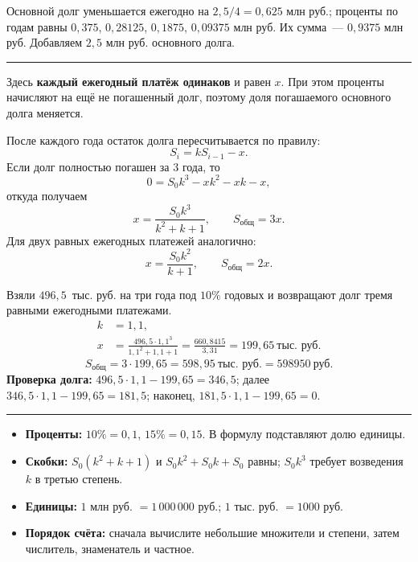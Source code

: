 \documentclass[a4paper,12pt]{article}
\newcommand{\key}[1]{\textcolor{darkaccent}{\textbf{#1}}}
\newcommand{\microhead}[1]{\vspace{2mm}{\large\textcolor{darkaccent}{\bfseries #1}}\par\vspace{1mm}}
\newcommand{\topic}[1]{\vspace{4mm}{\Large\textcolor{darkaccent}{\bfseries #1}}\par\vspace{1mm}\textcolor{rulegray}{\rule{\linewidth}{0.35pt}}\vspace{2mm}}
\begin{document}
\microhead{Проверка по годам}
Основной долг уменьшается ежегодно на $2{,}5/4=0{,}625$ млн руб.; проценты по годам равны $0{,}375$, $0{,}28125$, $0{,}1875$, $0{,}09375$ млн руб. Их сумма~--- $0{,}9375$ млн руб. Добавляем $2{,}5$ млн руб. основного долга.

\topic{5. Аннуитетный кредит}
Здесь \key{каждый ежегодный платёж одинаков} и равен $x$. При этом проценты начисляют на ещё не погашенный долг, поэтому доля погашаемого основного долга меняется.

После каждого года остаток долга пересчитывается по правилу:
\[
\boxed{S_{i}=kS_{i-1}-x.}
\]
Если долг полностью погашен за $3$ года, то
\[
0=S_0k^3-xk^2-xk-x,
\]
откуда получаем
\[
\boxed{x=\frac{S_0k^3}{k^2+k+1}},\qquad
\boxed{S_{\text{общ}}=3x}.
\]
Для двух равных ежегодных платежей аналогично:
\[
\boxed{x=\frac{S_0k^2}{k+1}},\qquad
\boxed{S_{\text{общ}}=2x}.
\]
\microhead{Пример. Три равных платежа}
Взяли $496{,}5$~тыс. руб. на три года под $10\%$ годовых и возвращают долг тремя равными ежегодными платежами.
\[
\begin{aligned}
k&=1{,}1,\\
x&=\frac{496{,}5\cdot1{,}1^3}{1{,}1^2+1{,}1+1}
=\frac{660{,}8415}{3{,}31}=199{,}65\ \text{тыс. руб.}
\end{aligned}
\]
\[
S_{\text{общ}}=3\cdot199{,}65=598{,}95\ \text{тыс. руб.}
=\boxed{598950\ \text{руб.}}
\]
\textbf{Проверка долга:} $496{,}5\cdot1{,}1-199{,}65=346{,}5$; далее $346{,}5\cdot1{,}1-199{,}65=181{,}5$; наконец, $181{,}5\cdot1{,}1-199{,}65=0$.

\topic{6. Вычисления и единицы измерения}
\begin{itemize}
\item \textbf{Проценты:} $10\%=0{,}1$, $15\%=0{,}15$. В формулу подставляют долю единицы.
\item \textbf{Скобки:} $S_0(k^2+k+1)$ и $S_0k^2+S_0k+S_0$ равны; $S_0k^3$ требует возведения $k$ в третью степень.
\item \textbf{Единицы:} $1$ млн руб. $=1\,000\,000$ руб.; $1$ тыс. руб. $=1000$ руб.
\item \textbf{Порядок счёта:} сначала вычислите небольшие множители и степени, затем числитель, знаменатель и частное.
\end{itemize}
\end{document}
